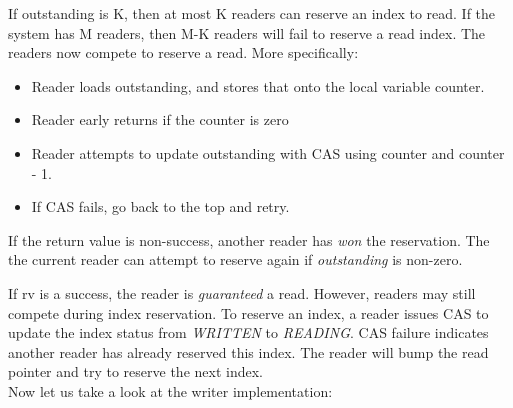 If outstanding is K, then at most K readers can reserve an index to read. If the system 
has M readers, then M-K readers will fail to reserve a read index. The readers now 
compete to reserve a read. More specifically: 
\begin{itemize}
    \item Reader loads outstanding, and stores that onto the local variable counter.
    \item Reader early returns if the counter is zero 
    \item Reader attempts to update outstanding with CAS using counter and counter - 1.
    \item If CAS fails, go back to the top and retry.
\end{itemize}

If the return value is non-success, another reader has \textit{won} the reservation. The
the current reader can attempt to reserve again if \textit{outstanding} is
non-zero.\newline

If rv is a success, the reader is \textit{guaranteed} a read. However, readers
may still compete during index reservation. To reserve an index, a reader issues
CAS to update the index status from \textit{WRITTEN} to \textit{READING}. CAS
failure indicates another reader has already reserved this index. The reader
will bump the read pointer and try to reserve the next index.\\

Now let us take a look at the writer implementation:\\

